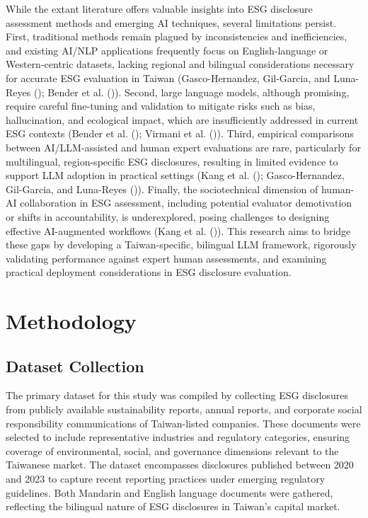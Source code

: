 \documentclass[
  12pt,
]{article}
\begin{document}
While the extant literature offers valuable insights into ESG disclosure
assessment methods and emerging AI techniques, several limitations
persist. First, traditional methods remain plagued by inconsistencies
and inefficiencies, and existing AI/NLP applications frequently focus on
English-language or Western-centric datasets, lacking regional and
bilingual considerations necessary for accurate ESG evaluation in Taiwan
(Gasco-Hernandez, Gil-Garcia, and Luna-Reyes
(); Bender et al.
()). Second, large language models,
although promising, require careful fine-tuning and validation to
mitigate risks such as bias, hallucination, and ecological impact, which
are insufficiently addressed in current ESG contexts (Bender et al.
(); Virmani et al.
()). Third, empirical comparisons
between AI/LLM-assisted and human expert evaluations are rare,
particularly for multilingual, region-specific ESG disclosures,
resulting in limited evidence to support LLM adoption in practical
settings (Kang et al. (); Gasco-Hernandez,
Gil-Garcia, and Luna-Reyes ()).
Finally, the sociotechnical dimension of human-AI collaboration in ESG
assessment, including potential evaluator demotivation or shifts in
accountability, is underexplored, posing challenges to designing
effective AI-augmented workflows (Kang et al.
()). This research aims to bridge these
gaps by developing a Taiwan-specific, bilingual LLM framework,
rigorously validating performance against expert human assessments, and
examining practical deployment considerations in ESG disclosure
evaluation.

\section{Methodology}\label{methodology}

\subsection{Dataset Collection}\label{dataset-collection}

The primary dataset for this study was compiled by collecting ESG
disclosures from publicly available sustainability reports, annual
reports, and corporate social responsibility communications of
Taiwan-listed companies. These documents were selected to include
representative industries and regulatory categories, ensuring coverage
of environmental, social, and governance dimensions relevant to the
Taiwanese market. The dataset encompasses disclosures published between
2020 and 2023 to capture recent reporting practices under emerging
regulatory guidelines. Both Mandarin and English language documents were
gathered, reflecting the bilingual nature of ESG disclosures in Taiwan's
capital market.
\end{document}
